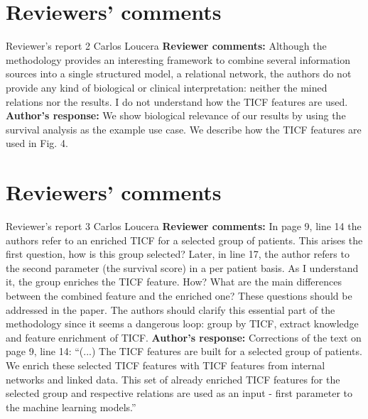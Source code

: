 \documentclass{bmcart}
\begin{document}
\begin{backmatter}
\section*{Reviewers' comments}
\newline Reviewer's report 2
\newline Carlos Loucera
\newline \textbf{Reviewer comments:}
Although the methodology provides an interesting framework to combine several information sources into a single structured model, a relational network, the authors do not provide any kind of biological or clinical interpretation: neither the mined relations nor the results. I do not understand how the TICF features are used.
\newline \textbf{Author's response:}
We show biological relevance of our results by using the survival analysis as the example use case. 
We describe how the TICF features are used in Fig. 4.


\section*{Reviewers' comments}
\newline Reviewer's report 3
\newline Carlos Loucera
\newline \textbf{Reviewer comments:}
In page 9, line 14 the authors refer to an enriched TICF for a selected group of patients. This arises the first question, how is this group selected? Later, in line 17, the author refers to the second parameter (the survival score) in a per patient basis. As I understand it, the group enriches the TICF feature. How? What are the main differences between the combined feature and the enriched one? These questions should be addressed in the paper. The authors should clarify this essential part of the methodology since it seems a dangerous loop: group by TICF, extract knowledge and feature enrichment of TICF. 
\newline \textbf{Author's response:}
Corrections of the text on page 9, line 14: “(...) The TICF features are built for a selected group of patients. We enrich these selected TICF features with TICF features from internal networks and linked data. This set of already enriched TICF features for the selected group and respective relations are used as an input - first parameter to the machine learning models.”


\end{backmatter}
\end{document}
